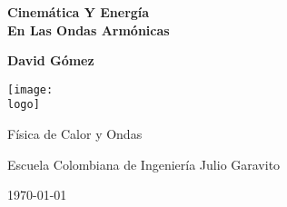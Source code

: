 \documentclass{article}
\newcommand{\logo}{"C:/Users/usuario/OneDrive/Documentos/U/logo-eci.png"}
\newcommand{\titlename}{Cinemática Y Energía\\[10pt] En Las Ondas Armónicas}%
\renewcommand{\author}{{David Gómez}}
\begin{document}
\begin{titlepage}
    \begin{center}
        \vspace{1cm}

        \textbf{\Huge{\titlename}}

        \vspace{1.5cm}

        \textbf{\large{\author}}

        \vspace{3cm}

        \texttt{[image: \\logo]}
        
        \vfill

        Física de Calor y Ondas

        Escuela Colombiana de Ingeniería Julio Garavito

        \today
    \end{center}
\end{titlepage}

\clearpage
\tableofcontents
















\end{document}
